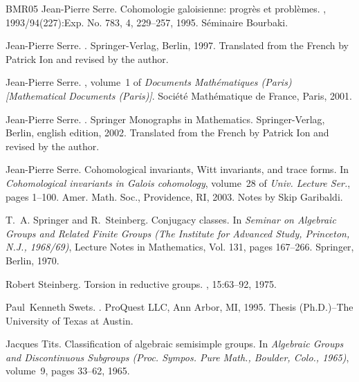 \documentclass[12pt]{amsart}
\numberwithin{equation}{section}
\theoremstyle{remark}
\begin{document}
\begin{thebibliography}{BMR05}
Jean-Pierre Serre.
\newblock Cohomologie galoisienne: progr\`es et probl\`emes.
, 1993/94(227):Exp. No. 783, 4, 229--257, 1995.
\newblock S\'{e}minaire Bourbaki.

Jean-Pierre Serre.
.
\newblock Springer-Verlag, Berlin, 1997.
\newblock Translated from the French by Patrick Ion and revised by the author.

Jean-Pierre Serre.
, volume~1 of {\em Documents Math\'{e}matiques (Paris) [Mathematical Documents (Paris)]}.
\newblock Soci{\'e}t{\'e} Math{\'e}matique de France, Paris, 2001.

Jean-Pierre Serre.
.
\newblock Springer Monographs in Mathematics. Springer-Verlag, Berlin, english edition, 2002.
\newblock Translated from the French by Patrick Ion and revised by the author.

Jean-Pierre Serre.
\newblock Cohomological invariants, {W}itt invariants, and trace forms.
\newblock In {\em Cohomological invariants in {G}alois cohomology}, volume~28 of {\em Univ. Lecture Ser.}, pages 1--100. Amer. Math. Soc., Providence, RI, 2003.
\newblock Notes by Skip Garibaldi.

T.~A. Springer and R.~Steinberg.
\newblock Conjugacy classes.
\newblock In {\em Seminar on {A}lgebraic {G}roups and {R}elated {F}inite {G}roups ({T}he {I}nstitute for {A}dvanced {S}tudy, {P}rinceton, {N}.{J}., 1968/69)}, Lecture Notes in Mathematics, Vol. 131, pages 167--266. Springer, Berlin, 1970.

Robert Steinberg.
\newblock Torsion in reductive groups.
, 15:63--92, 1975.

Paul~Kenneth Swets.
.
\newblock ProQuest LLC, Ann Arbor, MI, 1995.
\newblock Thesis (Ph.D.)--The University of Texas at Austin.

Jacques Tits.
\newblock Classification of algebraic semisimple groups.
\newblock In {\em Algebraic Groups and Discontinuous Subgroups (Proc. Sympos. Pure Math., Boulder, Colo., 1965)}, volume~9, pages 33--62, 1965.


\end{thebibliography}
\end{document}
